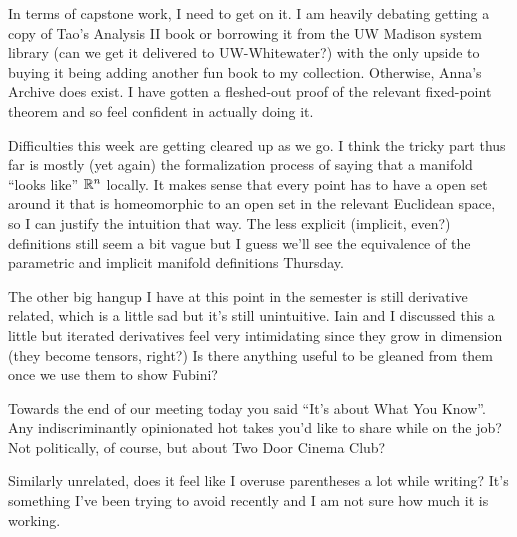 \documentclass[12pt]{article}
\begin{document}
In terms of capstone work, I need to get on it.
I am heavily debating getting a copy of Tao's Analysis II book or borrowing
it from the UW Madison system library (can we get it delivered to UW-Whitewater?)
with the only upside to buying it being adding another fun book to my collection.
Otherwise, Anna's Archive does exist.
I have gotten a fleshed-out proof of the relevant fixed-point theorem
and so feel confident in actually doing it.

Difficulties this week are getting cleared up as we go.
I think the tricky part thus far is mostly (yet again) the formalization process
of saying that a manifold ``looks like'' $\RR[n]$ locally.
It makes sense that every point has to have a open set around it that is
homeomorphic to an open set in the relevant Euclidean space, so I can justify the
intuition that way.
The less explicit (implicit, even?) definitions still seem a bit vague but I guess we'll
see the equivalence of the parametric and implicit manifold definitions Thursday.

The other big hangup I have at this point in the semester is still derivative related,
which is a little sad but it's still unintuitive.
Iain and I discussed this a little but iterated derivatives feel very intimidating since
they grow in dimension (they become tensors, right?)
Is there anything useful to be gleaned from them once we use them to show Fubini?

Towards the end of our meeting today you said ``It's about What You Know''.
Any indiscriminantly opinionated hot takes you'd like to share while on the job?
Not politically, of course, but about Two Door Cinema Club?

Similarly unrelated, does it feel like I overuse parentheses a lot while writing?
It's something I've been trying to avoid recently and I am not sure how much it is working.
\end{document}
